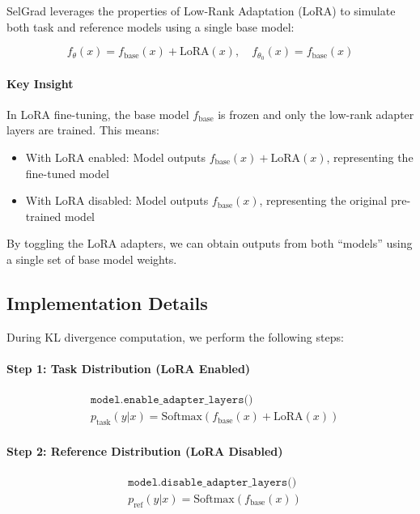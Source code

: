 SelGrad leverages the properties of Low-Rank Adaptation (LoRA) to simulate both task and reference models using a single base model:

\begin{equation}
f_\theta(x) = f_{\text{base}}(x) + \text{LoRA}(x), \quad f_{\theta_0}(x) = f_{\text{base}}(x)
\end{equation}

\paragraph{Key Insight}
In LoRA fine-tuning, the base model $f_{\text{base}}$ is frozen and only the low-rank adapter layers are trained. This means:
\begin{itemize}
    \item With LoRA enabled: Model outputs $f_{\text{base}}(x) + \text{LoRA}(x)$, representing the fine-tuned model
    \item With LoRA disabled: Model outputs $f_{\text{base}}(x)$, representing the original pre-trained model
\end{itemize}

By toggling the LoRA adapters, we can obtain outputs from both ``models'' using a single set of base model weights.

\subsection{Implementation Details}
\label{subsec:implementation}

During KL divergence computation, we perform the following steps:

\paragraph{Step 1: Task Distribution (LoRA Enabled)}
\begin{align}
&\texttt{model.enable\_adapter\_layers()} \nonumber \\
&p_{\text{task}}(y|x) = \text{Softmax}(f_{\text{base}}(x) + \text{LoRA}(x))
\end{align}

\paragraph{Step 2: Reference Distribution (LoRA Disabled)}
\begin{align}
&\texttt{model.disable\_adapter\_layers()} \nonumber \\
&p_{\text{ref}}(y|x) = \text{Softmax}(f_{\text{base}}(x))
\end{align}


